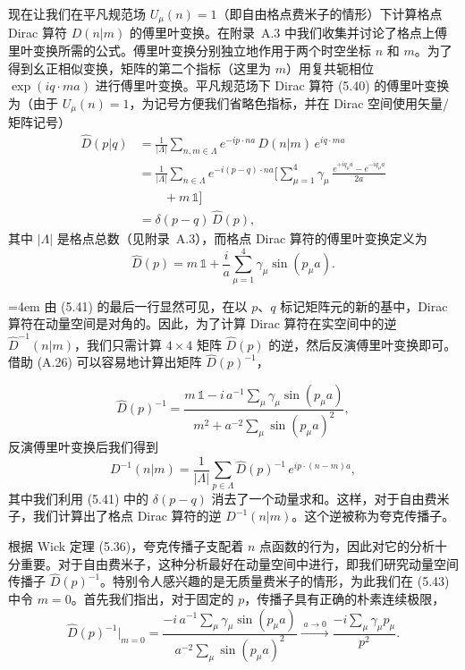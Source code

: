 现在让我们在平凡规范场 $U_\mu(n) = 1$（即自由格点费米子的情形）下计算格点 Dirac 算符 $D(n|m)$ 的傅里叶变换。在附录~A.3 中我们收集并讨论了格点上傅里叶变换所需的公式。傅里叶变换分别独立地作用于两个时空坐标 $n$ 和 $m$。为了得到幺正相似变换，矩阵的第二个指标（这里为 $m$）用复共轭相位 $\exp(iq\cdot ma)$ 进行傅里叶变换。平凡规范场下 Dirac 算符 (5.40) 的傅里叶变换为（由于 $U_\mu(n) = 1$，为记号方便我们省略色指标，并在 Dirac 空间使用矢量/矩阵记号）
\begin{equation}
  \begin{aligned}
    \hat{D}(p|q)
    &= \frac{1}{|\Lambda|}\sum_{n,m\in\Lambda}e^{-ip\cdot na}\,
      D(n|m)\,e^{iq\cdot ma}\\
    &= \frac{1}{|\Lambda|}\sum_{n\in\Lambda}e^{-i(p-q)\cdot na}\Big[
      \sum_{\mu=1}^{4}\gamma_\mu\,
      \frac{e^{+iq_\mu a} - e^{-iq_\mu a}}{2a}\\
    &\qquad + m\,\mathbb{1}\Big]\\
    &= \delta(p-q)\,\hat{D}(p) ,
  \end{aligned}
\end{equation}
其中 $|\Lambda|$ 是格点总数（见附录~A.3），而格点 Dirac 算符的傅里叶变换定义为
\begin{equation}
  \hat{D}(p) = m\,\mathbb{1} + \frac{i}{a}\sum_{\mu=1}^{4}\gamma_\mu\sin(p_\mu a) .
\end{equation}

\begingroup\emergencystretch=4em 由 (5.41) 的最后一行显然可见，在以 $p$、$q$ 标记矩阵元的新的基中，Dirac 算符在动量空间是对角的。因此，为了计算 Dirac 算符在实空间中的逆\linebreak[0] $\hat{D}^{-1}(n|m)$，我们只需计算 $4 \times 4$ 矩阵 $\hat{D}(p)$ 的逆，然后反演傅里叶变换即可。借助 (A.26) 可以容易地计算出矩阵 $\hat{D}(p)^{-1}$，\par\endgroup
\begin{equation}
  \hat{D}(p)^{-1} = \frac{m\,\mathbb{1} - i\,a^{-1}\sum_\mu\gamma_\mu\sin(p_\mu a)}
    {m^2 + a^{-2}\sum_\mu\sin(p_\mu a)^2} ,
\end{equation}
反演傅里叶变换后我们得到
\begin{equation}
  D^{-1}(n|m) = \frac{1}{|\Lambda|}\sum_{p\in\Lambda}\hat{D}(p)^{-1}\,
    e^{ip\cdot(n-m)a} ,
\end{equation}
其中我们利用 (5.41) 中的 $\delta(p-q)$ 消去了一个动量求和。这样，对于自由费米子，我们计算出了格点 Dirac 算符的逆 $D^{-1}(n|m)$。这个逆被称为夸克传播子。

根据 Wick 定理 (5.36)，夸克传播子支配着 $n$ 点函数的行为，因此对它的分析十分重要。对于自由费米子，这种分析最好在动量空间中进行，即我们研究动量空间传播子 $\hat{D}(p)^{-1}$。特别令人感兴趣的是无质量费米子的情形，为此我们在 (5.43) 中令 $m = 0$。首先我们指出，对于固定的 $p$，传播子具有正确的朴素连续极限，
\begin{equation}
  \hat{D}(p)^{-1}\Big|_{m=0}
  = \frac{-i\,a^{-1}\sum_\mu\gamma_\mu\sin(p_\mu a)}
         {a^{-2}\sum_\mu\sin(p_\mu a)^2}
  \xrightarrow{\;a\to 0\;}
  \frac{-i\sum_\mu\gamma_\mu p_\mu}{p^2} .
\end{equation}

